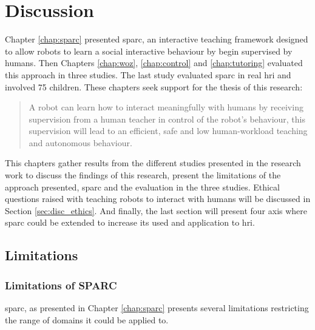 \chapter{Discussion} \label{chap:discussion}
\glsresetall

Chapter \ref{chap:sparc} presented \gls{sparc}, an interactive teaching framework designed to allow robots to learn a social interactive behaviour by begin supervised by humans. Then Chapters \ref{chap:woz}, \ref{chap:control} and \ref{chap:tutoring} evaluated this approach in three studies. The last study evaluated \gls{sparc} in real \gls{hri} and involved 75 children. These chapters seek support for the thesis of this research:

\begin{quote}
	A robot can learn how to interact meaningfully with humans by receiving supervision from a human teacher in control of the robot's behaviour, this supervision will lead to an efficient, safe and low human-workload teaching and autonomous behaviour.	
\end{quote}

This chapters gather results from the different studies presented in the research work to discuss the findings of this research, present the limitations of the approach presented, \gls{sparc} and the evaluation in the three studies. Ethical questions raised with teaching robots to interact with humans will be discussed in Section \ref{sec:disc_ethics}. And finally, the last section will present four axis where \gls{sparc} could be extended to increase its used and application to \gls{hri}.

\section{Limitations} \label{sec:disc_limitations}

\subsection{Limitations of SPARC}

\gls{sparc}, as presented in Chapter \ref{chap:sparc} presents several limitations restricting the range of domains it could be applied to.

